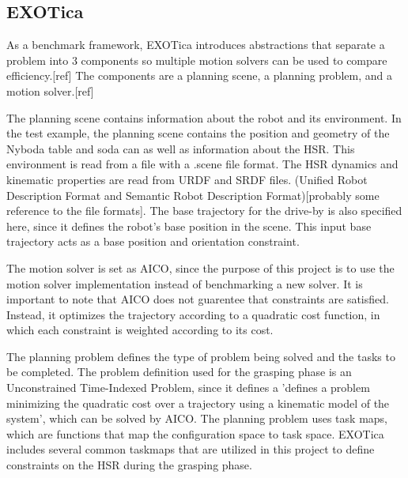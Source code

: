 \documentclass[12pt]{article}
\begin{document}
        \subsection{EXOTica \cite{koubaa_exotica_2019}}
            As a benchmark framework, EXOTica introduces abstractions that separate a problem into 3 components so multiple motion solvers can be used to compare efficiency.[ref] The components are a planning scene, a planning problem, and a motion solver.[ref]
                
            \par The planning scene contains information about the robot and its environment. In the test example, the planning scene contains the position and geometry of the Nyboda table and soda can as well as information about the HSR. This environment is read from a file with a .scene file format. The HSR dynamics and kinematic properties are read from URDF and SRDF files. (Unified Robot Description Format and Semantic Robot Description Format)[probably some reference to the file formats]. The base trajectory for the drive-by is also specified here, since it defines the robot's base position in the scene. This input base trajectory acts as a base position and orientation constraint.

            \par The motion solver is set as AICO, since the purpose of this project is to use the motion solver implementation instead of benchmarking a new solver. It is important to note that AICO does not guarentee that constraints are satisfied. Instead, it optimizes the trajectory according to a quadratic cost function, in which each constraint is weighted according to its cost.

            \par The planning problem defines the type of problem being solved and the tasks to be completed. The problem definition used for the grasping phase is an Unconstrained Time-Indexed Problem, since it defines a 'defines a problem minimizing the quadratic cost over a trajectory using a kinematic model of the system', which can be solved by AICO. The planning problem uses task maps, which are functions that map the configuration space to task space. EXOTica includes several common taskmaps that are utilized in this project to define constraints on the HSR during the grasping phase.
            
\end{document}
